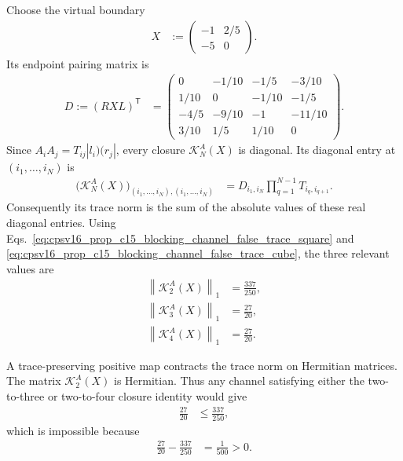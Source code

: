 \documentclass{article}
\begin{document}
Choose the virtual boundary
\begin{align}
    X
        &:= \begin{pmatrix}-1&2/5\\-5&0\end{pmatrix}.
    \label{eq:cpsv16_prop_c15_blocking_channel_false_boundary}
\end{align}
Its endpoint pairing matrix is
\begin{align}
    D:=(RXL)^{\mathsf T}
        &= \begin{pmatrix}
            0&-1/10&-1/5&-3/10\\
            1/10&0&-1/10&-1/5\\
            -4/5&-9/10&-1&-11/10\\
            3/10&1/5&1/10&0
        \end{pmatrix}.
    \label{eq:cpsv16_prop_c15_blocking_channel_false_endpoint_pairing}
\end{align}
Since $A_iA_j=T_{ij}|l_i)(r_j|$, every closure
$\mathcal K_N^A(X)$ is diagonal. Its diagonal entry at
$(i_1,\ldots,i_N)$ is
\begin{align}
    \bigl(\mathcal K_N^A(X)\bigr)_{(i_1,\ldots,i_N),(i_1,\ldots,i_N)}
        &= D_{i_1,i_N}\prod_{q=1}^{N-1}T_{i_q,i_{q+1}}.
    \label{eq:cpsv16_prop_c15_blocking_channel_false_diagonal_closure}
\end{align}
Consequently its trace norm is the sum of the absolute values of these real
diagonal entries. Using
Eqs.~\ref{eq:cpsv16_prop_c15_blocking_channel_false_trace_square} and
\ref{eq:cpsv16_prop_c15_blocking_channel_false_trace_cube}, the three
relevant values are
\begin{align}
    \left\|\mathcal K_2^A(X)\right\|_1
        &= \frac{337}{250},
    \label{eq:cpsv16_prop_c15_blocking_channel_false_two_site_norm}\\
    \left\|\mathcal K_3^A(X)\right\|_1
        &= \frac{27}{20},
    \label{eq:cpsv16_prop_c15_blocking_channel_false_three_site_norm}\\
    \left\|\mathcal K_4^A(X)\right\|_1
        &= \frac{27}{20}.
    \label{eq:cpsv16_prop_c15_blocking_channel_false_four_site_norm}
\end{align}

A trace-preserving positive map contracts the trace norm on Hermitian
matrices. The matrix $\mathcal K_2^A(X)$ is Hermitian. Thus any channel
satisfying either the two-to-three or two-to-four closure identity would give
\begin{align}
    \frac{27}{20}
        &\leq \frac{337}{250},
    \label{eq:cpsv16_prop_c15_blocking_channel_false_contractivity_contradiction}
\end{align}
which is impossible because
\begin{align}
    \frac{27}{20}-\frac{337}{250}
        &= \frac1{500}>0.
    \label{eq:cpsv16_prop_c15_blocking_channel_false_norm_gap}
\end{align}
\end{document}
